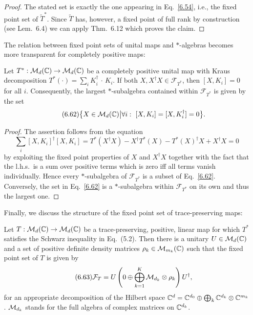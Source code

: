 \documentclass[11pt,a4paper]{article}
\theoremstyle{plain}
\theoremstyle{definition}
\theoremstyle{remark}
\begin{document}
\begin{proof}
    The stated set is exactly the one appearing in Eq.~\eqref{6.54}, i.e., the fixed
    point set of $\widetilde{T}^*$. Since $\widetilde{T}$ has, however, a fixed point
    of full rank by construction (see Lem.~6.4) we can apply Thm.~6.12 which proves
    the claim.
\end{proof}

The relation between fixed point sets of unital maps and $*$-algebras becomes
more transparent for completely positive maps:

\begin{theorem}
    Let $T^*:\mathcal{M}_d(\mathbb{C})\to\mathcal{M}_d(\mathbb{C})$ be a completely positive unital map with Kraus
    decomposition $T^*(\cdot)=\sum_i K_i^\dagger\,\cdot\,K_i$. If both $X,X^\dagger X\in
        \mathcal{F}_{T^*}$, then $[X,K_i]=0$ for all $i$. Consequently, the largest $*$-subalgebra
    contained within $\mathcal{F}_{T^*}$ is given by the set
    \begin{equation}\tag{6.62}
        \bigl\{X\in\mcM_d(\CC) \big| \forall i:\ [X,K_i]=[X,K_i^\dagger]=0\bigr\}.
    \end{equation}
\end{theorem}

\begin{proof}
    The assertion follows from the equation
    \[
        \sum_i [X,K_i]^\dagger [X,K_i]
        = T^*(X^\dagger X) - X^\dagger T^*(X) - T^*(X)^\dagger X + X^\dagger X
        = 0
    \]
    by exploiting the fixed point properties of $X$ and $X^\dagger X$ together with
    the fact that the l.h.s.\ is a sum over positive terms which is zero iff all
    terms vanish individually. Hence every $*$-subalgebra of $\mathcal{F}_{T^*}$ is a subset
    of Eq.~\eqref{6.62}. Conversely, the set in Eq.~\eqref{6.62} is a $*$-subalgebra
    within $\mathcal{F}_{T^*}$ on its own and thus the largest one.
\end{proof}

Finally, we discuss the structure of the fixed point set of trace-preserving maps:

\begin{theorem}
    Let $T:\mathcal{M}_d(\mathbb{C})\to\mathcal{M}_d(\mathbb{C})$ be a trace-preserving, positive, linear map for
    which $T^*$ satisfies the Schwarz inequality in Eq.~(5.2). Then there is a
    unitary $U\in\mathcal{M}_d(\mathbb{C})$ and a set of positive definite density matrices
    $\rho_k\in \mathcal{M}_{m_k}(\mathbb{C})$ such that the fixed point set of $T$ is given by
    \begin{equation}\tag{6.63}
        \mathcal{F}_T
        = U\left(0 \oplus \bigoplus_{k=1}^K \mathcal{M}_{d_k}\otimes \rho_k\right)U^\dagger,
    \end{equation}
    for an appropriate decomposition of the Hilbert space
    $\mathbb{C}^d = \mathbb{C}^{d_0}\oplus \bigoplus_k \mathbb{C}^{d_k}\otimes \mathbb{C}^{m_k}$. $\mathcal{M}_{d_k}$
    stands for the full algebra of complex matrices on $\mathbb{C}^{d_k}$.
\end{theorem}
\end{document}
